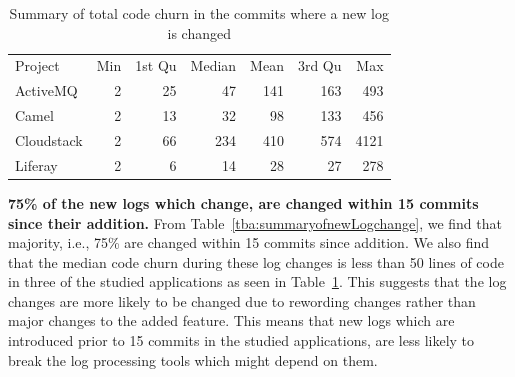 \begin{table}[t]
	\centering
	\caption{Summary of total code churn in the commits where a new log is changed}
	
	\begin{tabular}{lrrrrrr}
		\cline{1-7}
		Project    & Min & 1st Qu & Median & Mean & 3rd Qu & Max \\
		\cline{1-7}
		ActiveMQ   & 2  & 25      & 47     & 141    & 163     & 493  \\
		Camel      & 2   & 13      & 32      & 98    & 133      & 456 \\
		Cloudstack & 2   & 66      & 234      & 410   & 574     & 4121 \\
		Liferay    & 2   & 6      & 14     & 28    & 27     & 278\\	\cline{1-7}
		
	\end{tabular}
	\label{tba:summaryofnewLogCodechange}
\end{table}




\textbf{75\% of the new logs which change, are changed within 15 commits since their addition.} From Table~\ref{tba:summaryofnewLogchange}, we find that majority, i.e., 75\% are changed within 15 commits since addition.  We also find that the median code churn during these log changes is less than 50 lines of code in three of the studied applications as seen in Table~\ref{tba:summaryofnewLogCodechange}. This suggests that the log changes are more likely to be changed due to rewording changes rather than major changes to the added feature. This means that new logs which are introduced prior to 15 commits in the studied applications, are less likely to break the log processing tools which might depend on them. 






